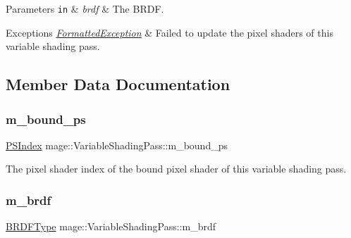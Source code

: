 \begin{DoxyParams}[1]{Parameters}
\mbox{\tt in}  & {\em brdf} & The B\+R\+DF. \\
\hline
\end{DoxyParams}

\begin{DoxyExceptions}{Exceptions}
{\em \hyperlink{structmage_1_1_formatted_exception}{Formatted\+Exception}} & Failed to update the pixel shaders of this variable shading pass. \\
\hline
\end{DoxyExceptions}


\subsection{Member Data Documentation}
\hypertarget{classmage_1_1_variable_shading_pass_acb1d0d78a9de9afc2d668d87134c5ec5}{}\label{classmage_1_1_variable_shading_pass_acb1d0d78a9de9afc2d668d87134c5ec5} 
\subsubsection{\texorpdfstring{m\+\_\+bound\+\_\+ps}{m\_bound\_ps}}
{\footnotesize\ttfamily \hyperlink{classmage_1_1_variable_shading_pass_a49519e421ac5be93136d9efdbf075d4a}{P\+S\+Index} mage\+::\+Variable\+Shading\+Pass\+::m\+\_\+bound\+\_\+ps\hspace{0.3cm}{\ttfamily [private]}}

The pixel shader index of the bound pixel shader of this variable shading pass. \hypertarget{classmage_1_1_variable_shading_pass_ac6147f2068fd7727fe2d78584ff68767}{}\label{classmage_1_1_variable_shading_pass_ac6147f2068fd7727fe2d78584ff68767} 
\subsubsection{\texorpdfstring{m\+\_\+brdf}{m\_brdf}}
{\footnotesize\ttfamily \hyperlink{namespacemage_ae7a7a03a7b34d7e2689689bb8295cd38}{B\+R\+D\+F\+Type} mage\+::\+Variable\+Shading\+Pass\+::m\+\_\+brdf\hspace{0.3cm}{\ttfamily [private]}}

